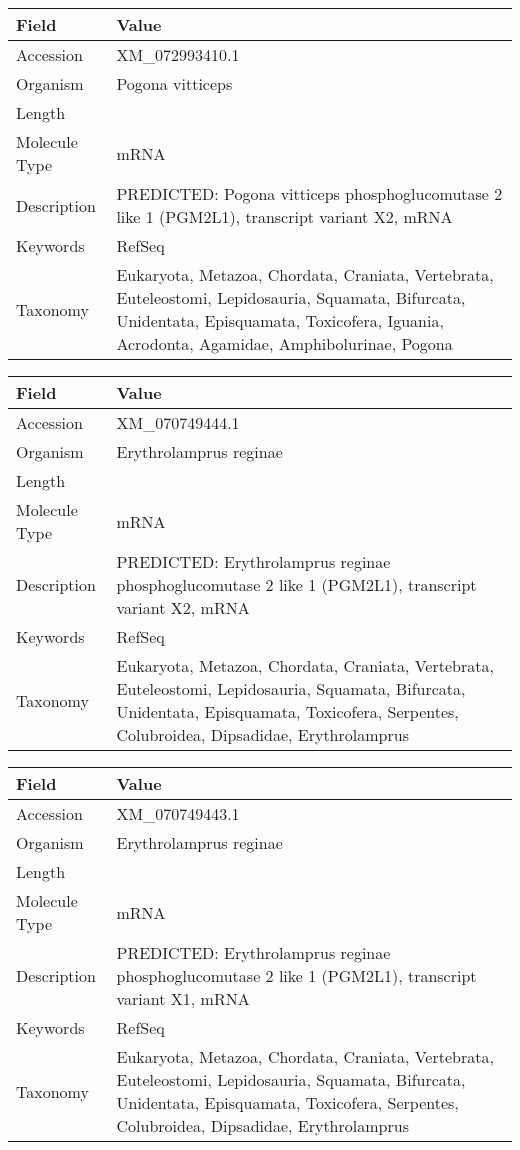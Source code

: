 \documentclass[10pt]{article}
\begin{document}
{\footnotesize
\begin{longtable}{>{\raggedright\arraybackslash}p{4.5cm} >{\raggedright\arraybackslash}p{11.5cm}}
\textbf{Field} & \textbf{Value} \\
\hline
Accession & XM\_072993410.1 \\
Organism & Pogona vitticeps \\
Length & 3715 \\
Molecule Type & mRNA \\
Description & PREDICTED: Pogona vitticeps phosphoglucomutase 2 like 1 (PGM2L1), transcript variant X2, mRNA \\
Keywords & RefSeq \\
Taxonomy & Eukaryota, Metazoa, Chordata, Craniata, Vertebrata, Euteleostomi, Lepidosauria, Squamata, Bifurcata, Unidentata, Episquamata, Toxicofera, Iguania, Acrodonta, Agamidae, Amphibolurinae, Pogona \\
\end{longtable}
}

{\footnotesize
\begin{longtable}{>{\raggedright\arraybackslash}p{4.5cm} >{\raggedright\arraybackslash}p{11.5cm}}
\textbf{Field} & \textbf{Value} \\
\hline
Accession & XM\_070749444.1 \\
Organism & Erythrolamprus reginae \\
Length & 2399 \\
Molecule Type & mRNA \\
Description & PREDICTED: Erythrolamprus reginae phosphoglucomutase 2 like 1 (PGM2L1), transcript variant X2, mRNA \\
Keywords & RefSeq \\
Taxonomy & Eukaryota, Metazoa, Chordata, Craniata, Vertebrata, Euteleostomi, Lepidosauria, Squamata, Bifurcata, Unidentata, Episquamata, Toxicofera, Serpentes, Colubroidea, Dipsadidae, Erythrolamprus \\
\end{longtable}
}

{\footnotesize
\begin{longtable}{>{\raggedright\arraybackslash}p{4.5cm} >{\raggedright\arraybackslash}p{11.5cm}}
\textbf{Field} & \textbf{Value} \\
\hline
Accession & XM\_070749443.1 \\
Organism & Erythrolamprus reginae \\
Length & 2631 \\
Molecule Type & mRNA \\
Description & PREDICTED: Erythrolamprus reginae phosphoglucomutase 2 like 1 (PGM2L1), transcript variant X1, mRNA \\
Keywords & RefSeq \\
Taxonomy & Eukaryota, Metazoa, Chordata, Craniata, Vertebrata, Euteleostomi, Lepidosauria, Squamata, Bifurcata, Unidentata, Episquamata, Toxicofera, Serpentes, Colubroidea, Dipsadidae, Erythrolamprus \\
\end{longtable}
}
\end{document}
